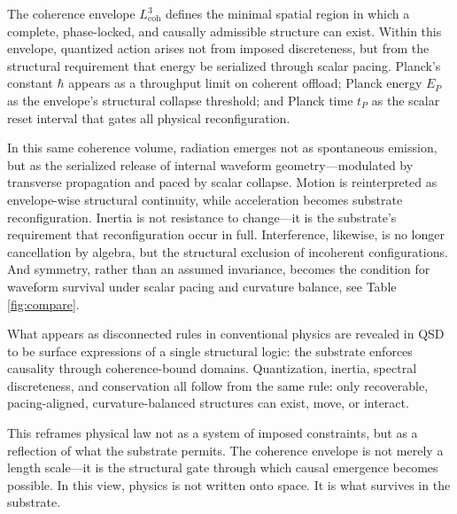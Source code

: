 \documentclass[entropy,article,submit,pdftex,oneauthor]{Definitions/mdpi}
\begin{document}
The coherence envelope \texorpdfstring{\( L_{\text{coh}}^3 \)}{Lcoh\^{}3} defines the minimal spatial region in which a complete, phase-locked, and causally admissible structure can exist. Within this envelope, quantized action arises not from imposed discreteness, but from the structural requirement that energy be serialized through scalar pacing. Planck’s constant \texorpdfstring{\( \hbar \)}{hbar} appears as a throughput limit on coherent offload; Planck energy \texorpdfstring{\( E_P \)}{Ep} as the envelope’s structural collapse threshold; and Planck time \texorpdfstring{\( t_P \)}{tP} as the scalar reset interval that gates all physical reconfiguration.

In this same coherence volume, radiation emerges not as spontaneous emission, but as the serialized release of internal waveform geometry—modulated by transverse propagation and paced by scalar collapse. Motion is reinterpreted as envelope-wise structural continuity, while acceleration becomes substrate reconfiguration. Inertia is not resistance to change—it is the substrate’s requirement that reconfiguration occur in full. Interference, likewise, is no longer cancellation by algebra, but the structural exclusion of incoherent configurations. And symmetry, rather than an assumed invariance, becomes the condition for waveform survival under scalar pacing and curvature balance, see Table \ref{fig:compare}.

What appears as disconnected rules in conventional physics are revealed in QSD to be surface expressions of a single structural logic: the substrate enforces causality through coherence-bound domains. Quantization, inertia, spectral discreteness, and conservation all follow from the same rule: only recoverable, pacing-aligned, curvature-balanced structures can exist, move, or interact.

This reframes physical law not as a system of imposed constraints, but as a reflection of what the substrate permits. The coherence envelope is not merely a length scale—it is the structural gate through which causal emergence becomes possible. In this view, physics is not written onto space. It is what survives in the substrate.
\end{document}
